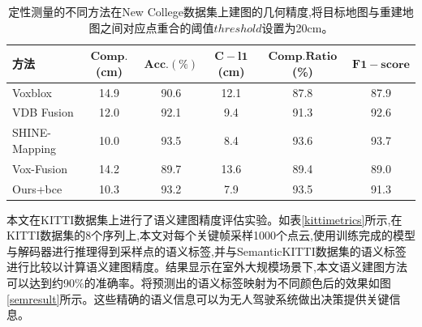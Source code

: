 \begin{table}[htbp]
    \centering
    \caption{定性测量的不同方法在New College数据集上建图的几何精度,将目标地图与重建地图之间对应点重合的阈值$threshold$设置为20cm。}\label{ncdmetric}
    \begin{tabular}[htbp]{llccccc}
        \toprule
        \multicolumn{2}{l}{方法} & $\mathbf{Comp.}$(cm) & $\mathbf{Acc.}(\%)$ & $\mathbf{C-l1}$(cm) &  $\mathbf{Comp. Ratio}$(\%) &$\mathbf{F1-score}$\\
        \midrule
        \multicolumn{2}{l}{Voxblox} & 14.9 & 90.6 &12.1 &87.8&87.9\\
        \multicolumn{2}{l}{VDB Fusion} & 12.0&92.1&9.4&91.3&92.6 \\
        \multicolumn{2}{l}{SHINE-Mapping} & 10.0&93.5&8.4&93.6&93.7 \\
        \multicolumn{2}{l}{Vox-Fusion} & 14.2 & 89.7& 13.6&89.4&89.0\\
        \midrule
        \multicolumn{2}{l}{Ours+bce} &10.3& 93.2 & 7.9 &93.5&91.3\\
        \bottomrule
    \end{tabular}
\end{table}
本文在KITTI数据集上进行了语义建图精度评估实验。如表\ref{kittimetrics}所示,在KITTI数据集的8个序列上,本文对每个关键帧采样1000个点云,使用训练完成的模型与解码器进行推理得到采样点的语义标签,并与SemanticKITTI数据集的语义标签进行比较以计算语义建图精度。结果显示在室外大规模场景下,本文语义建图方法可以达到约90\%的准确率。将预测出的语义标签映射为不同颜色后的效果如图\ref{semresult}所示。这些精确的语义信息可以为无人驾驶系统做出决策提供关键信息。


